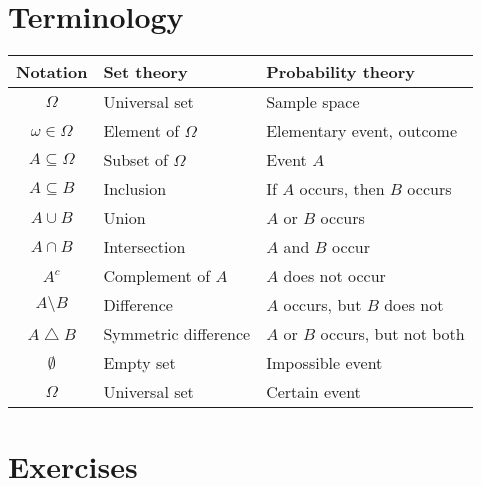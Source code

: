 \section{Terminology}
\begin{table}[h]
\centering\small
\begin{tabular}{|c|l|l|} \hline
Notation 			& Set theory			& Probability theory \\ \hline
$\Omega$			& Universal set			& Sample space \\ 
$\omega\in\Omega$	& Element of $\Omega$	& Elementary event, outcome \\
$A\subseteq\Omega$	& Subset of $\Omega$	& Event $A$ \\
$A\subseteq B$		& Inclusion				& If $A$ occurs, then $B$ occurs \\
$A\cup B$			& Union					& $A$ or $B$ occurs \\ 
$A\cap B$			& Intersection			& $A$ and $B$ occur\\ 
$A^c$				& Complement of $A$		& $A$ does not occur \\
$A\setminus B$		& Difference			& $A$ occurs, but $B$ does not \\
$A\bigtriangleup B$	& Symmetric difference	& $A$ or $B$ occurs, but not both \\
$\emptyset$			& Empty set 			& Impossible event \\
$\Omega$			& Universal set			& Certain event \\ \hline
\end{tabular}
\end{table}


\section{Exercises}


\endinput
